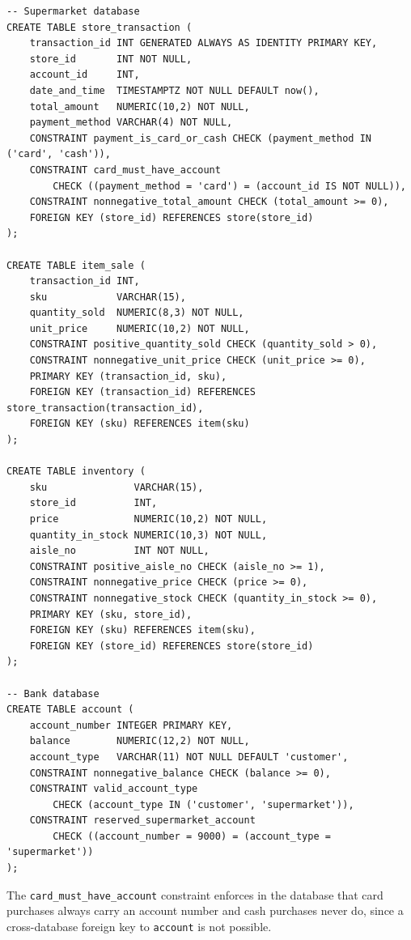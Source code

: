 \documentclass[11pt,letterpaper]{article}
\begin{document}
\begin{lstlisting}
-- Supermarket database
CREATE TABLE store_transaction (
    transaction_id INT GENERATED ALWAYS AS IDENTITY PRIMARY KEY,
    store_id       INT NOT NULL,
    account_id     INT,
    date_and_time  TIMESTAMPTZ NOT NULL DEFAULT now(),
    total_amount   NUMERIC(10,2) NOT NULL,
    payment_method VARCHAR(4) NOT NULL,
    CONSTRAINT payment_is_card_or_cash CHECK (payment_method IN ('card', 'cash')),
    CONSTRAINT card_must_have_account
        CHECK ((payment_method = 'card') = (account_id IS NOT NULL)),
    CONSTRAINT nonnegative_total_amount CHECK (total_amount >= 0),
    FOREIGN KEY (store_id) REFERENCES store(store_id)
);

CREATE TABLE item_sale (
    transaction_id INT,
    sku            VARCHAR(15),
    quantity_sold  NUMERIC(8,3) NOT NULL,
    unit_price     NUMERIC(10,2) NOT NULL,
    CONSTRAINT positive_quantity_sold CHECK (quantity_sold > 0),
    CONSTRAINT nonnegative_unit_price CHECK (unit_price >= 0),
    PRIMARY KEY (transaction_id, sku),
    FOREIGN KEY (transaction_id) REFERENCES store_transaction(transaction_id),
    FOREIGN KEY (sku) REFERENCES item(sku)
);

CREATE TABLE inventory (
    sku               VARCHAR(15),
    store_id          INT,
    price             NUMERIC(10,2) NOT NULL,
    quantity_in_stock NUMERIC(10,3) NOT NULL,
    aisle_no          INT NOT NULL,
    CONSTRAINT positive_aisle_no CHECK (aisle_no >= 1),
    CONSTRAINT nonnegative_price CHECK (price >= 0),
    CONSTRAINT nonnegative_stock CHECK (quantity_in_stock >= 0),
    PRIMARY KEY (sku, store_id),
    FOREIGN KEY (sku) REFERENCES item(sku),
    FOREIGN KEY (store_id) REFERENCES store(store_id)
);

-- Bank database
CREATE TABLE account (
    account_number INTEGER PRIMARY KEY,
    balance        NUMERIC(12,2) NOT NULL,
    account_type   VARCHAR(11) NOT NULL DEFAULT 'customer',
    CONSTRAINT nonnegative_balance CHECK (balance >= 0),
    CONSTRAINT valid_account_type
        CHECK (account_type IN ('customer', 'supermarket')),
    CONSTRAINT reserved_supermarket_account
        CHECK ((account_number = 9000) = (account_type = 'supermarket'))
);
\end{lstlisting}

The \texttt{card\_must\_have\_account} constraint enforces in the database that card purchases always carry an account number and cash purchases never do, since a cross-database foreign key to \texttt{account} is not possible.
\end{document}
